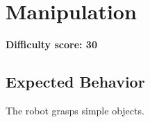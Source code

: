 \section{Manipulation}

\textbf{Difficulty score: 30}

\subsection{Expected Behavior}
The robot grasps simple objects.


